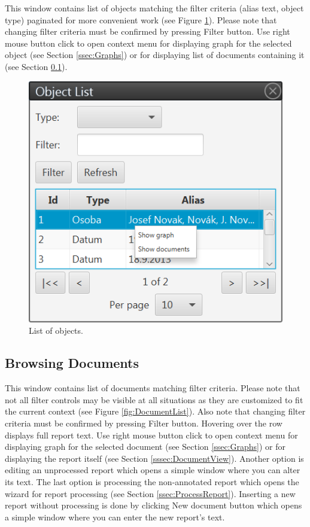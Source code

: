 This window contains list of objects matching the filter criteria (alias text,
object type) paginated for more convenient work (see Figure
\ref{fig:ObjectList}). Please note that changing filter criteria must be confirmed by pressing Filter button. Use right mouse button click to open context menu for displaying graph for the selected object (see Section \ref{ssec:Graphs}) or for displaying list of documents containing it (see
Section \ref{sssec:DocumentList}).

\begin{figure}[!htb]
        \centering
        \includegraphics{Images/objectlist}
        \caption{List of objects.}
        \label{fig:ObjectList}
\end{figure}

\subsection{Browsing Documents}
\label{sssec:DocumentList}

This window contains list of documents matching filter criteria. Please note
that not all filter controls may be visible at all situations as they are
customized to fit the current context (see Figure \ref{fig:DocumentList}).
Also note that changing filter criteria must be confirmed by pressing Filter
button. Hovering over the row displays full report text. Use right mouse button
click to open context menu for displaying graph for the selected document (see
Section \ref{ssec:Graphs}) or for displaying the report itself (see Section
\ref{sssec:DocumentView}). Another option is editing an unprocessed report
which opens a simple window where you can alter its text. The last option is
processing the non-annotated report which opens the wizard for report processing
(see Section \ref{ssec:ProcessReport}). Inserting a new report without
processing is done by clicking New document button which opens a simple window
where you can enter the new report's text.

